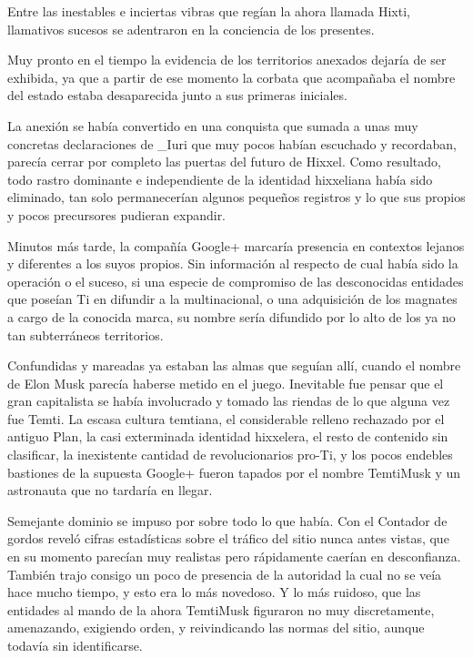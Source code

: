 \documentclass[
  spanish,
]{book}
\begin{document}
Entre las inestables e inciertas vibras que regían la ahora llamada Hixti, llamativos sucesos se adentraron en la conciencia de los presentes.

Muy pronto en el tiempo la evidencia de los territorios anexados dejaría de ser exhibida, ya que a partir de ese momento la corbata que acompañaba el nombre del estado estaba desaparecida junto a sus primeras iniciales.

La anexión se había convertido en una conquista que sumada a unas muy concretas declaraciones de \_Iuri que muy pocos habían escuchado y recordaban, parecía cerrar por completo las puertas del futuro de Hixxel. Como resultado, todo rastro dominante e independiente de la identidad hixxeliana había sido eliminado, tan solo permanecerían algunos pequeños registros y lo que sus propios y pocos precursores pudieran expandir.

Minutos más tarde, la compañía Google+ marcaría presencia en contextos lejanos y diferentes a los suyos propios. Sin información al respecto de cual había sido la operación o el suceso, si una especie de compromiso de las desconocidas entidades que poseían Ti en difundir a la multinacional, o una adquisición de los magnates a cargo de la conocida marca, su nombre sería difundido por lo alto de los ya no tan subterráneos territorios.

Confundidas y mareadas ya estaban las almas que seguían allí, cuando el nombre de Elon Musk parecía haberse metido en el juego. Inevitable fue pensar que el gran capitalista se había involucrado y tomado las riendas de lo que alguna vez fue Temti. La escasa cultura temtiana, el considerable relleno rechazado por el antiguo Plan, la casi exterminada identidad hixxelera, el resto de contenido sin clasificar, la inexistente cantidad de revolucionarios pro-Ti, y los pocos endebles bastiones de la supuesta Google+ fueron tapados por el nombre TemtiMusk y un astronauta que no tardaría en llegar.

Semejante dominio se impuso por sobre todo lo que había. Con el Contador de gordos reveló cifras estadísticas sobre el tráfico del sitio nunca antes vistas, que en su momento parecían muy realistas pero rápidamente caerían en desconfianza. También trajo consigo un poco de presencia de la autoridad la cual no se veía hace mucho tiempo, y esto era lo más novedoso. Y lo más ruidoso, que las entidades al mando de la ahora TemtiMusk figuraron no muy discretamente, amenazando, exigiendo orden, y reivindicando las normas del sitio, aunque todavía sin identificarse.
\end{document}
